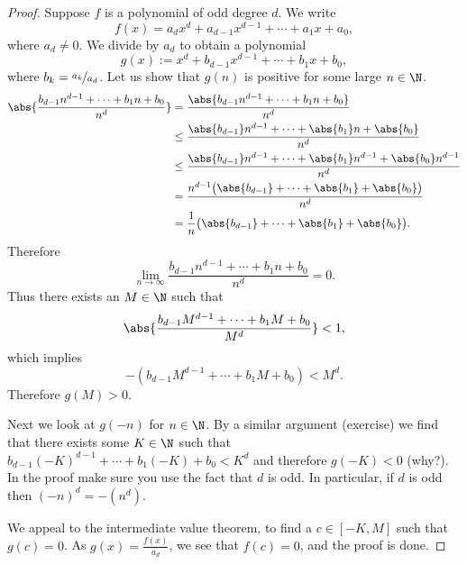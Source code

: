 \documentclass[12pt]{book}
\begin{document}
\begin{proof}
Suppose $f$ is a polynomial of odd degree $d$.
We write
\begin{equation*}
f(x) = a_d x^d + a_{d-1} x^{d-1} + \cdots + a_1 x + a_0 ,
\end{equation*}
where $a_d \not= 0$.
We divide by $a_d$ to obtain a polynomial
\begin{equation*}
g(x) := x^d + b_{d-1} x^{d-1} + \cdots + b_1 x + b_0 ,
\end{equation*}
where $b_k = \nicefrac{a_k}{a_d}$.
Let us show that $g(n)$ is
positive for some large $n \in \N$.
\begin{equation*}
\begin{split}
\abs{\frac{b_{d-1} n^{d-1} + \cdots + b_1 n + b_0}{n^d}}
& =
\frac{\abs{b_{d-1} n^{d-1} + \cdots + b_1 n + b_0}}{n^d}
\\
& \leq
\frac{\abs{b_{d-1}} n^{d-1} + \cdots + \abs{b_1} n + \abs{b_0}}{n^d}
\\
& \leq
\frac{\abs{b_{d-1}} n^{d-1} + \cdots + \abs{b_1} n^{d-1} + \abs{b_0} n^{d-1}}{n^d}
\\
& =
\frac{n^{d-1}\bigl(\abs{b_{d-1}} + \cdots + \abs{b_1} + \abs{b_0}\bigr)}{n^d}
\\
& =
\frac{1}{n}
\bigl(\abs{b_{d-1}} + \cdots + \abs{b_1} + \abs{b_0}\bigr) .
\end{split}
\end{equation*}
Therefore
\begin{equation*}
\lim_{n\to\infty} \frac{b_{d-1} n^{d-1} + \cdots + b_1 n + b_0}{n^d}
= 0 .
\end{equation*}
Thus there exists an $M \in \N$ such that 
\begin{equation*}
\abs{\frac{b_{d-1} M^{d-1} + \cdots + b_1 M + b_0}{M^d}} < 1 ,
\end{equation*}
which implies
\begin{equation*}
-(b_{d-1} M^{d-1} + \cdots + b_1 M + b_0) < M^d .
\end{equation*}
Therefore $g(M) > 0$.

Next we look at $g(-n)$ for $n \in \N$.
By a similar argument (exercise)
we find that there exists some $K \in \N$ such that
$b_{d-1} {(-K)}^{d-1} + \cdots + b_1 (-K) + b_0 < K^d$
and therefore $g(-K) < 0$ (why?).
In the
proof make sure you use the fact that $d$ is odd.
In particular, 
if $d$ is odd then ${(-n)}^d = -(n^d)$.

We appeal to the intermediate value theorem, to find a
$c \in [-K,M]$ such that $g(c) = 0$.
As $g(x) = \frac{f(x)}{a_d}$,
we see that $f(c) = 0$, and the proof is done.
\end{proof}
\end{document}
